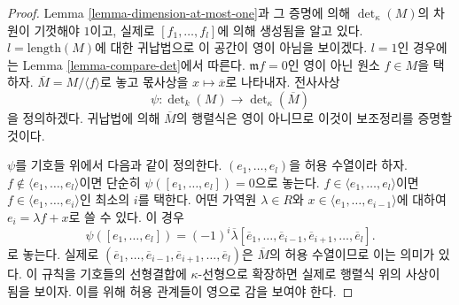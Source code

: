 \begin{proof}
Lemma \ref{lemma-dimension-at-most-one}과 그 증명에 의해
$\det_\kappa(M)$의 차원이 기껏해야 $1$이고, 실제로
$[f_1, \ldots, f_l]$에 의해 생성됨을 알고 있다.
$l = \text{length}(M)$에 대한 귀납법으로 이 공간이 영이 아님을
보이겠다. $l = 1$인 경우에는 Lemma \ref{lemma-compare-det}에서
따른다. $\mathfrak m f = 0$인 영이 아닌 원소 $f \in M$을 택하자.
$\overline{M} = M /\langle f \rangle$로 놓고 몫사상을
$x \mapsto \overline{x}$로 나타내자. 전사사상
$$
\psi : \det\nolimits_k(M) \to \det\nolimits_\kappa(\overline{M})
$$
을 정의하겠다. 귀납법에 의해 $\overline{M}$의 행렬식은 영이 아니므로
이것이 보조정리를 증명할 것이다.

\medskip\noindent
$\psi$를 기호들 위에서 다음과 같이 정의한다.
$(e_1, \ldots, e_l)$을 허용 수열이라 하자.
$f \not \in \langle e_1, \ldots, e_l \rangle$이면 단순히
$\psi([e_1, \ldots, e_l]) = 0$으로 놓는다.
$f \in \langle e_1, \ldots, e_l \rangle$이면
$f \in \langle e_1, \ldots, e_i \rangle$인 최소의 $i$를 택한다.
어떤 가역원 $\lambda \in R$와
$x \in \langle e_1, \ldots, e_{i - 1} \rangle$에 대하여
$e_i = \lambda f + x$로 쓸 수 있다. 이 경우
$$
\psi([e_1, \ldots, e_l]) =
(-1)^i
\overline{\lambda}[\overline{e}_1, \ldots,
\overline{e}_{i - 1},
\overline{e}_{i + 1}, \ldots, \overline{e}_l].
$$
로 놓는다. 실제로
$(\overline{e}_1, \ldots,
\overline{e}_{i - 1},
\overline{e}_{i + 1}, \ldots, \overline{e}_l)$은
$\overline{M}$의 허용 수열이므로 이는 의미가 있다. 이 규칙을 기호들의
선형결합에 $\kappa$-선형으로 확장하면 실제로 행렬식 위의 사상이 됨을
보이자. 이를 위해 허용 관계들이 영으로 감을 보여야 한다.


\end{proof}
